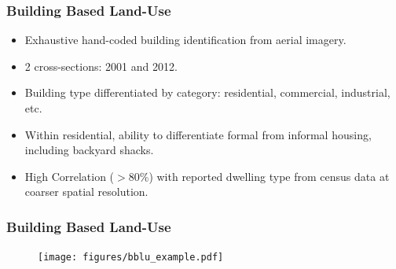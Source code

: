 \documentclass[aspectratio=149]{beamer}
\begin{document}

\begin{frame}
\frametitle{Building Based Land-Use}

\begin{itemize}

  \item Exhaustive hand-coded building identification  from aerial imagery. 
  \vspace{2mm}
  \item 2 cross-sections: 2001 and 2012. 
  \vspace{2mm}
  \item Building type differentiated by category: residential, commercial, industrial, etc.
  \vspace{2mm}
  \item Within residential, ability to differentiate formal from informal housing, including backyard shacks.
  \vspace{2mm}
  \item High Correlation ($>$80\%) with reported dwelling type from census data at coarser spatial resolution.
\end{itemize}
\end{frame}


\begin{frame}
\frametitle{Building Based Land-Use}

\begin{figure}
 \texttt{[image: figures/bblu\_example.pdf]} 
\end{figure}
\end{frame}

\end{document}
